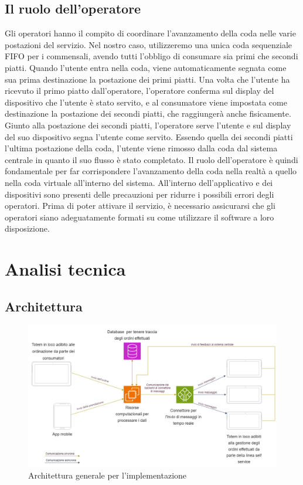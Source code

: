 \documentclass[a4paper, titlepage, 12pt, openright, twoside]{book}
\begin{document}
\subsection{Il ruolo dell'operatore}
Gli operatori hanno il compito di coordinare l'avanzamento della coda nelle varie postazioni del servizio.
Nel nostro caso, utilizzeremo una unica coda sequenziale FIFO per i commensali, avendo tutti l'obbligo di consumare sia primi che secondi piatti.
Quando l'utente entra nella coda, viene automaticamente segnata come sua prima destinazione la postazione dei primi piatti.
Una volta che l'utente ha ricevuto il primo piatto dall'operatore, l'operatore conferma sul display del dispositivo che l'utente è stato servito,
e al consumatore viene impostata come destinazione la postazione dei secondi piatti, che raggiungerà anche fisicamente.
Giunto alla postazione dei secondi piatti, l'operatore serve l'utente e sul display del suo dispositivo segna l'utente come servito. Essendo quella dei secondi piatti l'ultima
postazione della coda, l'utente viene rimosso dalla coda dal sistema centrale in quanto il suo flusso è stato completato. Il ruolo dell'operatore è quindi fondamentale per far corrispondere l'avanzamento della coda nella realtà a quello nella coda virtuale all'interno del sistema. All'interno dell'applicativo e dei dispositivi sono presenti delle precauzioni per ridurre i possibili errori degli operatori. Prima di poter attivare il servizio, è necessario assicurarsi che gli operatori siano adeguatamente formati su come utilizzare il software a loro disposizione.

\section{Analisi tecnica}

\subsection{Architettura}

\begin{figure}[h]
\caption{Architettura generale per l'implementazione}
\includegraphics[scale=0.40]{architettura}
\centering
\end{figure}
\end{document}
